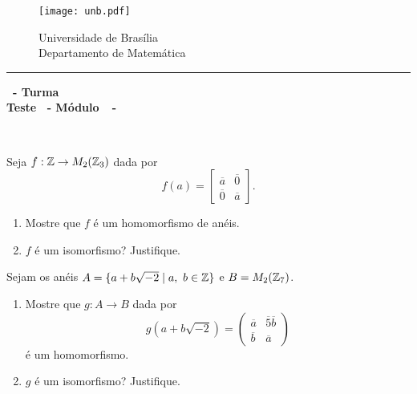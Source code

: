 \documentclass[12pt]{exam}
\begin{document}
    \begin{figure}[h]
        \begin{minipage}[c]{1.7cm}
            \texttt{[image: unb.pdf]}
        \end{minipage}
        \hspace{0pt}
        \begin{minipage}[c]{4in}
            {Universidade de Brasília} \\
            {Departamento de Matemática}
        \end{minipage}
    \end{figure}
    \hrule
    \begin{center}
        {\Large\bf \disciplina\ - Turma \turma}  \\
         {\large\bf Teste \numeroteste\ - Módulo\ \modulo\ -\ \dataavaliacao}
    \end{center}

    \\
    \vspace*{.01cm}


    \vspace{.4cm}


    \questao Seja $f : \mathbb{Z} \to M_2(\mathbb{Z}_3)$ dada por
    \[
        f(a) = \begin{bmatrix}
            \overline{a} & \overline{0}\\
            \overline{0} & \overline{a}
        \end{bmatrix}.
    \]
    \begin{enumerate}[label=({\alph*})]
        \item Mostre que $f$ é um homomorfismo de anéis.

        \item $f$ é um isomorfismo? Justifique.
    \end{enumerate}

    \vspace{.4cm}

    \questao Sejam os anéis $A = \{ a + b\sqrt{-2} \mid a,\ b \in \mathbb{Z}\}$ e $B = M_2(\mathbb{Z}_7)$.
    \begin{enumerate}[label=({\alph*})]
        \item Mostre que $g : A \to B$ dada por
        \[
            g(a + b\sqrt{-2}) =
            \begin{pmatrix}
                \overline{a} & \overline{5}\overline{b}\\
                \overline{b} & \overline{a}
            \end{pmatrix}
        \]
        é um homomorfismo.

        \item $g$ é um isomorfismo? Justifique.
    \end{enumerate}
    \vspace{1cm}
\end{document}
